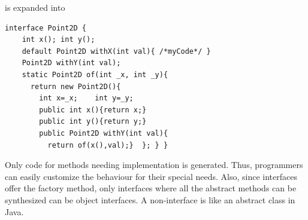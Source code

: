 \noindent is expanded into
\begin{lstlisting}
interface Point2D {
    int x(); int y();
    default Point2D withX(int val){ /*myCode*/ }
    Point2D withY(int val);
    static Point2D of(int _x, int _y){
      return new Point2D(){
        int x=_x;    int y=_y;
        public int x(){return x;}
        public int y(){return y;} 
        public Point2D withY(int val){
          return of(x(),val);}  }; } }
\end{lstlisting}

\noindent Only code for methods needing implementation is generated. Thus,
programmers can easily customize the behaviour for their special needs.
Also, since \mixin interfaces offer the \Q@of@ factory method, only interfaces where all the abstract methods
can be synthesized can be object interfaces. A non-\mixin interface is like an abstract class in Java.





